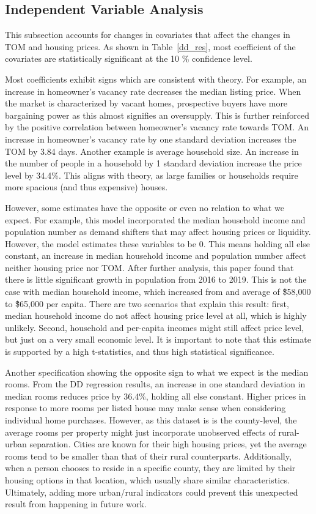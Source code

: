 \subsection{Independent Variable Analysis}
This subsection accounts for changes in covariates that affect the changes in TOM and housing prices. As shown in Table~\ref{dd_res}, most coefficient of the covariates are statistically significant at the 10 \% confidence level.  

Most coefficients exhibit signs which are consistent with theory. For example, an increase in homeowner’s vacancy rate decreases the median listing price. When the market is characterized by vacant homes, prospective buyers have more bargaining power as this almost signifies an oversupply. This is further reinforced by the positive correlation between homeowner’s vacancy rate towards TOM. An increase in homeowner’s vacancy rate by one standard deviation increases the TOM by 3.84 days. Another example is average household size. An increase in the number of people in a household by 1 standard deviation increase the price level by 34.4\%. This aligns with theory, as large families or households require more spacious (and thus expensive) houses. 

However, some estimates have the opposite or even no relation to what we expect. For example, this model incorporated the median household income and population number as demand shifters that may affect housing prices or liquidity. However, the model estimates these variables to be 0. This means holding all else constant, an increase in median household income and population number affect neither housing price nor TOM. After further analysis, this paper found that there is little significant growth in population from 2016 to 2019. This is not the case with median household income, which increased from and average of \~\$58,000 to \~\$65,000 per capita. There are two scenarios that explain this result: first, median household income do not affect housing price level at all, which is highly unlikely. Second, household and per-capita incomes might still affect price level, but just on a very small economic level. It is important to note that this estimate is supported by a high t-statistics, and thus high statistical significance.

Another specification showing the opposite sign to what we expect is the median rooms. From the DD regression results, an increase in one standard deviation in median rooms reduces price by 36.4\%, holding all else constant. Higher prices in response to more rooms per listed house may make sense when considering individual home purchases. However, as this dataset is is the county-level, the average rooms per property might just incorporate unobserved effects of rural-urban separation. Cities are known for their high housing prices, yet the average rooms tend to be smaller than that of their rural counterparts. Additionally, when a person chooses to reside in a specific county, they are limited by their housing options in that location, which usually share similar characteristics. Ultimately, adding more urban/rural indicators could prevent this unexpected result from happening in future work.

